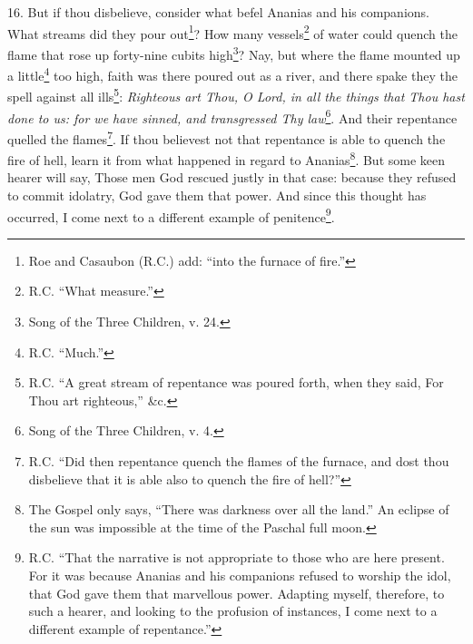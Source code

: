16. But if thou disbelieve, consider what befel Ananias and his companions. What streams did they pour out\footnote{Roe and Casaubon (R.C.) add: “into the furnace of fire.”}? How many vessels\footnote{R.C. “What measure.”} of water could quench the flame that rose up forty-nine cubits high\footnote{Song of the Three Children, v. 24.}? Nay, but where the flame mounted up a little\footnote{R.C. “Much.”} too high, faith was there poured out as a river, and there spake they the spell against all ills\footnote{R.C. “A great stream of repentance was poured forth, when they said, For Thou art righteous,” \&c.}: \emph{Righteous art Thou, O Lord, in all the things that Thou hast done to us: for we have sinned, and transgressed Thy law}\footnote{Song of the Three Children, v. 4.}. And their repentance quelled the flames\footnote{R.C. “Did then repentance quench the flames of the furnace, and dost thou disbelieve that it is able also to quench the fire of hell?”}. If thou believest not that repentance is able to quench the fire of hell, learn it from what happened in regard to Ananias\footnote{The Gospel only says, “There was darkness over all the land.” An eclipse of the sun was impossible at the time of the Paschal full moon.}. But some keen hearer will say, Those men God rescued justly in that case: because they refused to commit idolatry, God gave them that power. And since this thought has occurred, I come next to a different example of penitence\footnote{R.C. “That the narrative is not appropriate to those who are here present. For it was because Ananias and his companions refused to worship the idol, that God gave them that marvellous power. Adapting myself, therefore, to such a hearer, and looking to the profusion of instances, I come next to a different example of repentance.”}.

